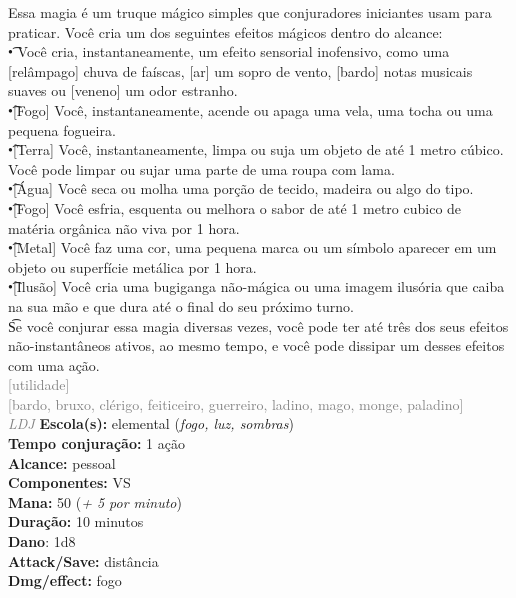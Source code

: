 \documentclass{RPG_Adventure}[2021/10/20]
\begin{document}
{\normalsize Essa magia é um truque mágico simples que conjuradores iniciantes usam para praticar. Você cria um dos seguintes efeitos mágicos dentro do alcance:\\\t • Você cria, instantaneamente, um efeito sensorial inofensivo, como uma [relâmpago] chuva de faíscas, [ar] um sopro de vento, [bardo] notas musicais suaves ou [veneno] um odor estranho.\\\t •[Fogo] Você, instantaneamente, acende ou apaga uma vela, uma tocha ou uma pequena fogueira.\\\t •[Terra] Você, instantaneamente, limpa ou suja um objeto de até 1 metro cúbico. Você pode limpar ou sujar uma parte de uma roupa com lama.\\\t •[Água] Você seca ou molha uma porção de tecido, madeira ou algo do tipo.\\\t •[Fogo] Você esfria, esquenta ou melhora o sabor de até 1 metro cubico de matéria orgânica não viva por 1 hora.\\\t •[Metal] Você faz uma cor, uma pequena marca ou um símbolo aparecer em um objeto ou superfície metálica por 1 hora.\\\t •[Ilusão] Você cria uma bugiganga não-mágica ou uma imagem ilusória que caiba na sua mão e que dura até o final do seu próximo turno.\\\t Se você conjurar essa magia diversas vezes, você pode ter até três dos seus efeitos não-instantâneos ativos, ao mesmo tempo, e você pode dissipar um desses efeitos com uma ação.\\}
{\scriptsize \textcolor{gray}{[utilidade]\\}}
{\scriptsize \textcolor{gray}{[bardo, bruxo, clérigo, feiticeiro, guerreiro, ladino, mago, monge, paladino]\\}}
{\tiny \textcolor{gray}{\textit{LDJ}}}
{\small \t \textbf{Escola(s):} elemental (\textit{fogo, luz, sombras})\\\t \textbf{Tempo conjuração:} 1 ação\\\t \textbf{Alcance:} pessoal\\\t \textbf{Componentes:} VS\\\t \textbf{Mana:} 50 (\textit{+ 5 por minuto})\\\t \textbf{Duração:} 10 minutos\\\t \textbf{Dano}: 1d8\\\t \textbf{Attack/Save:} distância\\\t \textbf{Dmg/effect:} fogo\\}
\end{document}
